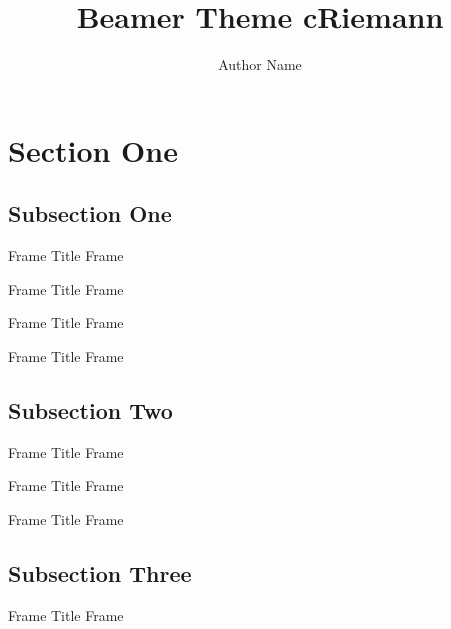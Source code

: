 \documentclass[12pt,xcolor={rgb}]{beamer}
\begin{document}
\title{Beamer Theme cRiemann}
\author{Author Name}

\begin{frame}[plain]
\titlepage
\end{frame}

\section{Section One}

\subsection{Subsection One}

\begin{frame}{Frame Title}
Frame \insertframenumber
\end{frame}

\begin{frame}{Frame Title}
Frame \insertframenumber
\end{frame}

\begin{frame}{Frame Title}
Frame \insertframenumber
\end{frame}

\begin{frame}{Frame Title}
Frame \insertframenumber
\end{frame}

\subsection{Subsection Two}

\begin{frame}{Frame Title}
Frame \insertframenumber
\end{frame}

\begin{frame}{Frame Title}
Frame \insertframenumber
\end{frame}

\begin{frame}{Frame Title}
Frame \insertframenumber
\end{frame}

\subsection{Subsection Three}

\begin{frame}{Frame Title}
Frame \insertframenumber
\end{frame}
\end{document}
